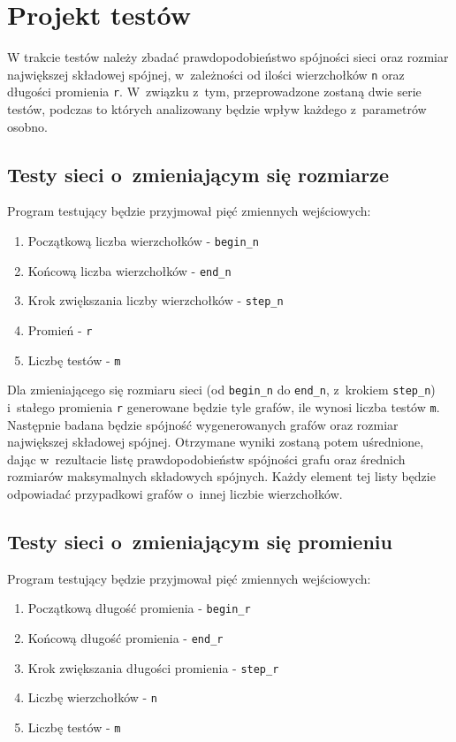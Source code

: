 \section{Projekt testów}
	\label{projekt:testy}

	W trakcie testów należy zbadać prawdopodobieństwo spójności sieci oraz rozmiar największej składowej spójnej, w~zależności od ilości wierzchołków \texttt{n} oraz długości promienia \texttt{r}. W~związku z~tym, przeprowadzone zostaną dwie serie testów, podczas to których analizowany będzie wpływ każdego z~parametrów osobno.

	\subsection{Testy sieci o~zmieniającym się rozmiarze}
		\label{projekt:testy:rozmiar}

		\noindent Program testujący będzie przyjmował pięć zmiennych wejściowych:
		\begin{enumerate}
			\item Początkową liczba wierzchołków - \texttt{begin\_n}
			\item Końcową liczba wierzchołków - \texttt{end\_n}
			\item Krok zwiększania liczby wierzchołków - \texttt{step\_n}
			\item Promień - \texttt{r}
			\item Liczbę testów - \texttt{m}
		\end{enumerate}

		Dla zmieniającego się rozmiaru sieci (od \texttt{begin\_n} do \texttt{end\_n}, z~krokiem \texttt{step\_n}) i~stałego promienia \texttt{r} generowane będzie tyle grafów, ile wynosi liczba testów \texttt{m}. Następnie badana będzie spójność wygenerowanych grafów oraz rozmiar największej składowej spójnej. Otrzymane wyniki zostaną potem uśrednione, dając w~rezultacie listę prawdopodobieństw spójności grafu oraz średnich rozmiarów maksymalnych składowych spójnych. Każdy element tej listy będzie odpowiadać przypadkowi grafów o~innej liczbie wierzchołków.

	\subsection{Testy sieci o~zmieniającym się promieniu}
		\label{projekt:testy:promien}

		\noindent Program testujący będzie przyjmował pięć zmiennych wejściowych:
		\begin{enumerate}
			\item Początkową długość promienia - \texttt{begin\_r}
			\item Końcową długość promienia - \texttt{end\_r}
			\item Krok zwiększania długości promienia - \texttt{step\_r}
			\item Liczbę wierzchołków - \texttt{n}
			\item Liczbę testów - \texttt{m}
		\end{enumerate}

